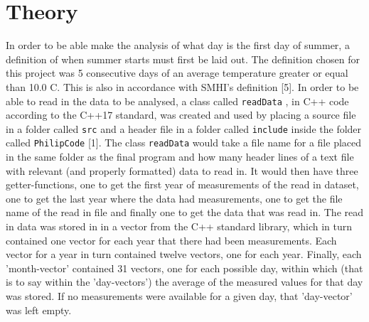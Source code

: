 \documentclass[a4, 12pt]{article}
\begin{document}
\section{Theory}
In order to be able make the analysis of what day is the first day of summer, a definition of when summer starts must first be laid out. The definition chosen for this project was 5 consecutive days of an average temperature greater or equal than 10.0 \textdegree C. This is also in accordance with SMHI's definition [5]. \newline
\indent In order to be able to read in the data to be analysed, a class called \texttt{readData} , in C++ code according to the C++17 standard, was created and used by placing a source file in a folder called \texttt{src} and a header file in a folder called \texttt{include} inside the folder called \texttt{PhilipCode} [1]. The class \texttt{readData} would take a file name for a file placed in the same folder as the final program and how many header lines of a text file with relevant (and properly formatted) data to read in. It would then have three getter-functions, one to get the first year of measurements of the read in dataset, one to get the last year where the data had measurements, one to get the file name of the read in file and finally one to get the data that was read in. The read in data was stored in in a vector from the C++ standard library, which in turn contained one vector for each year that there had been measurements. Each vector for a year in turn contained twelve vectors, one for each year. Finally, each 'month-vector' contained 31 vectors, one for each possible day, within which (that is to say within the 'day-vectors') the average of the measured values for that day was stored. If no measurements were available for a given day, that 'day-vector' was left empty. \newline
\end{document}
